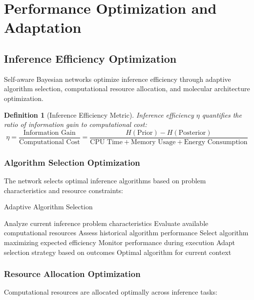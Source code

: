 \documentclass[12pt,a4paper]{article}
\newtheorem{definition}[theorem]{Definition}
\begin{document}
\section{Performance Optimization and Adaptation}

\subsection{Inference Efficiency Optimization}

Self-aware Bayesian networks optimize inference efficiency through adaptive algorithm selection, computational resource allocation, and molecular architecture optimization.

\begin{definition}[Inference Efficiency Metric]
Inference efficiency $\eta$ quantifies the ratio of information gain to computational cost:
\begin{equation}
\eta = \frac{\text{Information Gain}}{\text{Computational Cost}} = \frac{H(\text{Prior}) - H(\text{Posterior})}{\text{CPU Time} + \text{Memory Usage} + \text{Energy Consumption}}
\end{equation}
\end{definition}

\subsubsection{Algorithm Selection Optimization}

The network selects optimal inference algorithms based on problem characteristics and resource constraints:

\begin{algorithm}
\caption{Adaptive Algorithm Selection}
\begin{algorithmic}[1]
\STATE Analyze current inference problem characteristics
\STATE Evaluate available computational resources
\STATE Assess historical algorithm performance
\STATE Select algorithm maximizing expected efficiency
\STATE Monitor performance during execution
\STATE Adapt selection strategy based on outcomes
\RETURN Optimal algorithm for current context
\end{algorithmic}
\end{algorithm}

\subsubsection{Resource Allocation Optimization}

Computational resources are allocated optimally across inference tasks:
\end{document}
